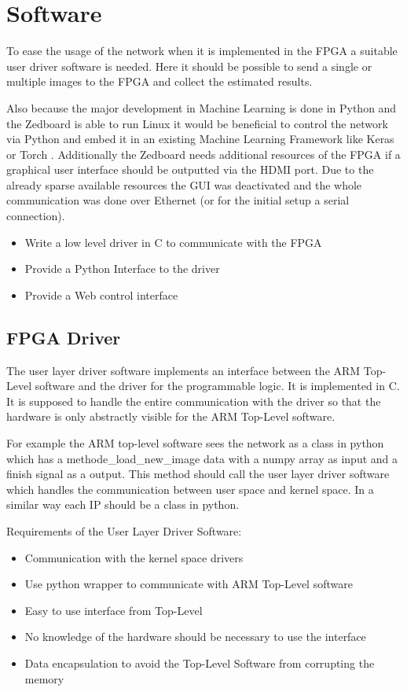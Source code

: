 \section{Software}

To ease the usage of the network when it is implemented in the FPGA a suitable user driver software is needed. Here it should be possible to send a single or multiple images to the FPGA and collect the estimated results. 

Also because the major development in Machine Learning is done in Python and the Zedboard is able to run Linux it would be beneficial to control the network via Python and embed it in an existing Machine Learning Framework like Keras \cite{Gulli:2017aa} or Torch \cite{Paszke:2019aa}. Additionally the Zedboard needs additional resources of the FPGA if a graphical user interface should be outputted via the HDMI port. Due to the already sparse available resources the GUI was deactivated and the whole communication was done over Ethernet (or for the initial setup a serial connection). 

\begin{itemize}
	\item Write a low level driver in C to communicate with the FPGA
	\item Provide a Python Interface to the driver
	\item Provide a Web control interface
\end{itemize}


\subsection{FPGA Driver}

The user layer driver software implements an interface between the ARM Top-Level software and the driver for the programmable logic. It is implemented in C. It is supposed to handle the entire communication with the driver so that the hardware is only abstractly visible for the ARM Top-Level software.

For example the ARM top-level software sees the network as a class in python which has a methode\_load\_new\_image data with a numpy array as input and a finish signal as a output. This method should call the user layer driver software which handles the communication between user space and kernel space. In a similar way each IP should be a class in python. 

Requirements of the User Layer Driver Software:
\begin{itemize} 
	\item Communication with the kernel space drivers 
	\item Use python wrapper to communicate with ARM Top-Level software
	\item Easy to use interface from Top-Level 
	\item No knowledge of the hardware should be necessary to use the interface
	\item Data encapsulation to avoid the Top-Level Software from corrupting the memory 
\end{itemize}

